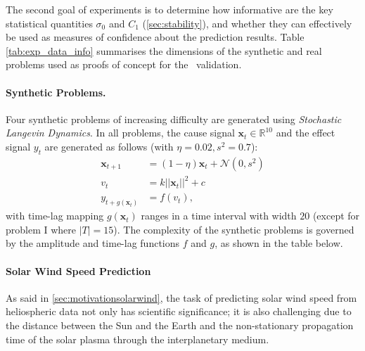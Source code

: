 The second goal of experiments is to determine how informative are the key statistical quantities 
$\sigma_0$ and $C_1$ (\cref{sec:stability}), and whether they can effectively be used as 
measures of confidence about the prediction results. Table \ref{tab:exp_data_info} summarises the 
dimensions of the synthetic and real problems used as proofs of concept for the \XX\ validation. 

\paragraph{Synthetic Problems.}
Four synthetic problems of increasing difficulty are generated using 
\emph{Stochastic Langevin Dynamics}. In all problems, the cause signal 
$\mathbf{x}_t \in \mathbb{R}^{10}$ and the effect signal $y_t$ are generated as follows 
(with $\eta = 0.02, s^2 = 0.7$): 
\begin{align}
 \mathbf{x}_{t+1} &= (1 - \eta) \mathbf{x}_t + \mathcal{N}(0, s^2) \label{eq:data}\\
 v_t &= k ||\mathbf{x}_t||^2 + c\\
 y_{t+g(\mathbf{x}_t)} &= f(v_t), \label{eq:outputs}
\end{align} 
with time-lag mapping $g(\mathbf{x}_t)$ ranges in a time interval with width $20$ 
(except for problem I where $|T| = 15$). The complexity of the synthetic 
problems is governed by the amplitude and time-lag functions $f$ and $g$, as 
shown in the table below.\\

\centerline{  
}

\paragraph{Solar Wind Speed Prediction}\label{sec:solarwind}
As said in \cref{sec:motivationsolarwind}, the task of predicting solar wind speed from 
heliospheric data not only has scientific significance; it is also challenging due to the distance 
between the Sun and the Earth and the non-stationary propagation time of the solar plasma through 
the interplanetary medium. 

